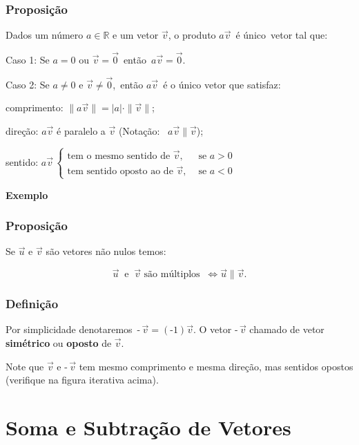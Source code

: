 \documentclass[
  brazilian,
  letterpaper,
  DIV=11,
  numbers=noendperiod]{scrreprt}
\theoremstyle{definition}
\theoremstyle{plain}
\theoremstyle{definition}
\theoremstyle{remark}
\begin{document}
\subsection{Proposição}\label{proposiuxe7uxe3o-4}

Dados um número \(a\in\mathbb{R}\) e um vetor \(\vec{v}\), o produto
\(a\vec{v}\)~é único~vetor tal que:

Caso 1: Se \(a=0\) ou \(\vec{v}=\vec{0}\)~então~\(a\vec{v}=\vec{0}\).

Caso 2: Se \(a\ne 0\) e \(\vec{v}\ne\vec{0}\),~então \(a\vec{v}\)~é o
único vetor que satisfaz:

comprimento: \(\|a\vec{v}\|=|a|\cdot \|\vec{v}\|\);

direção: \(a\vec{v}\) é paralelo a \(\vec{v}\) (Notação:
~\(a\vec{v}\parallel\vec{v}\));

sentido:
\(a\vec{v} \,  \begin{cases}  \text{tem o mesmo sentido de } \vec{v}, & \text{ se } a>0 \\ \text{tem sentido oposto ao de } \vec{v}, &\text{ se } a<0 \end{cases}\)

\textbf{Exemplo}

\subsection{Proposição}\label{proposiuxe7uxe3o-5}

Se \(\vec{u}\) e \(\vec{v}\) são vetores não nulos temos:

\[
\vec{u} \ \text{ e }\ \vec{v} \text{ são múltiplos } \  \Leftrightarrow \vec{u}\parallel\vec{v}.
\]

\subsection{Definição}\label{definiuxe7uxe3o-4}

Por simplicidade denotaremos~\(\text{-}\,\vec{v}=(\text{-}1)\vec{v}\). O
vetor \(\text{-}\,\vec{v}\) chamado de vetor \textbf{simétrico} ou
\textbf{oposto} de \(\vec{v}\).

Note que \(\vec{v}\) e \(\text{-}\,\vec{v}\) tem mesmo comprimento e
mesma direção, mas sentidos opostos (verifique na figura iterativa
acima).


\chapter{Soma e Subtração de
Vetores}\label{soma-e-subtrauxe7uxe3o-de-vetores}
\end{document}
